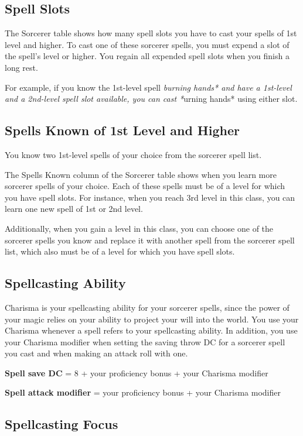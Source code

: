 \subsection{Spell Slots}

The Sorcerer table shows how many spell slots you have to cast your spells of 1st level and higher. To cast one of these sorcerer spells, you must expend a slot of the spell's level or higher. You regain all expended spell slots when you finish a long rest.

For example, if you know the 1st-level spell \textit{burning hands* and have a 1st-level and a 2nd-level spell slot available, you can cast *}urning hands* using either slot.

\subsection{Spells Known of 1st Level and Higher}

You know two 1st-level spells of your choice from the sorcerer spell list.

The Spells Known column of the Sorcerer table shows when you learn more sorcerer spells of your choice. Each of these spells must be of a level for which you have spell slots. For instance, when you reach 3rd level in this class, you can learn one new spell of 1st or 2nd level.

Additionally, when you gain a level in this class, you can choose one of the sorcerer spells you know and replace it with another spell from the sorcerer spell list, which also must be of a level for which you have spell slots.

\subsection{Spellcasting Ability}

Charisma is your spellcasting ability for your sorcerer spells, since the power of your magic relies on your ability to project your will into the world. You use your Charisma whenever a spell refers to your spellcasting ability. In addition, you use your Charisma modifier when setting the saving throw DC for a sorcerer spell you cast and when making an attack roll with one.

\textbf{Spell save DC} = 8 + your proficiency bonus + your Charisma modifier

\textbf{Spell attack modifier} = your proficiency bonus + your Charisma modifier

\subsection{Spellcasting Focus}

